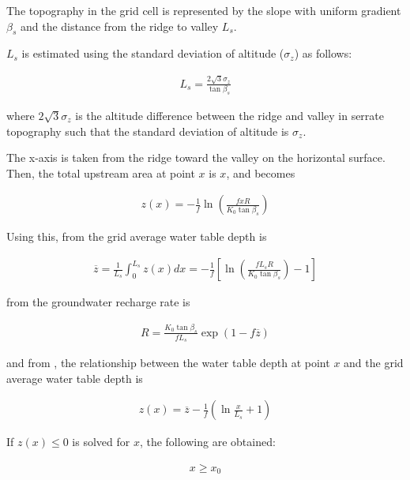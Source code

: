The topography in the grid cell is represented by the slope with uniform gradient \(\beta_s\) and the distance from the ridge to valley \(L_s\).

\(L_s\) is estimated using the standard deviation of altitude (\(\sigma_z\)) as follows:

\begin{eqnarray}
L_s = \frac{2\sqrt{3} \sigma_z}{\tan\beta_s}
\label{eq269}
\end{eqnarray}

where \(2\sqrt{3}\sigma_z\) is the altitude difference between the ridge and valley in serrate topography such that the standard deviation of altitude is \(\sigma_z\).

The x-axis is taken from the ridge toward the valley on the horizontal surface. Then, the total upstream area at point \(x\) is \(x\), and \hyperref[eq264]{} becomes

\begin{eqnarray}
z(x) = - \frac{1}{f} \ln \left( \frac{fxR}{K_0 \tan \beta_s}\right)
\label{eq270}
\end{eqnarray}

Using this, from \hyperref[eq265]{} the grid average water table depth is

\begin{eqnarray}
\overline{z} = \frac 1{L_s}\int_0^{L_s} z(x) dx
 = - \frac1{f}\left[
 \ln \left( \frac{f L_s R}{K_0 \tan\beta_s}\right) -1
\right]
\label{eq271}
\end{eqnarray}

from \hyperref[eq267]{} the groundwater recharge rate is

\begin{eqnarray}
R = \frac{K_0 \tan\beta_s}{f L_s}\exp(1-f \overline{z}) \label{eq272}
\end{eqnarray}

and from \hyperref[eq268]{}, the relationship between the water table depth at point \(x\) and the grid average water table depth is

\begin{eqnarray}
z(x) = \overline{z} - \frac{1}{f}\left(
\ln \frac{x}{L_s} + 1
\right)
\label{eq273}
\end{eqnarray}

If \(z(x) \leq 0\) is solved for \(x\), the following are obtained:

\begin{eqnarray}
x \geq x_0
\label{eq274}
\end{eqnarray}

